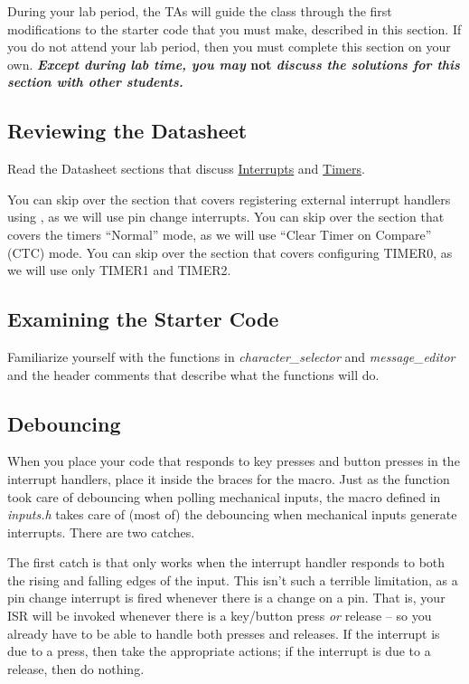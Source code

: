 During your lab period, the TAs will guide the class through the first modifications to the starter code that you must make, described in this section.
If you do not attend your lab period, then you must complete this section on your own.
\textbf{\textit{Except during lab time, you may }not\textit{ discuss the solutions for this section with other students.}}


\subsection{Reviewing the Datasheet}

Read the Datasheet sections that discuss \href{https://cow-pi.readthedocs.io/en/latest/microcontroller.html#interrupts}{Interrupts} and \href{https://cow-pi.readthedocs.io/en/latest/microcontroller.html#timers}{Timers}.

You can skip over the section that covers registering external interrupt handlers using , as we will use pin change interrupts.
You can skip over the section that covers the timers ``Normal'' mode, as we will use ``Clear Timer on Compare'' (CTC) mode.
You can skip over the section that covers configuring TIMER0, as we will use only TIMER1 and TIMER2.

\subsection{Examining the Starter Code}

Familiarize yourself with the functions in \textit{character\_selector} and \textit{message\_editor} and the header comments that describe what the functions will do.

\subsection{Debouncing} \label{subsec:debouncing}

When you place your code that responds to key presses and button presses in the interrupt handlers, place it inside the braces for the  macro.
Just as the  function took care of debouncing when polling mechanical inputs, the  macro defined in \textit{inputs.h} takes care of (most of) the debouncing when mechanical inputs generate interrupts.
There are two catches.

The first catch is that  only works when the interrupt handler responds to both the rising and falling edges of the input.
This isn't such a terrible limitation, as a pin change interrupt is fired whenever there is a change on a pin.
That is, your ISR will be invoked whenever there is a key/button press \textit{or} release --
so you already have to be able to handle both presses and releases.
If the interrupt is due to a press, then take the appropriate actions;
if the interrupt is due to a release, then do nothing.

